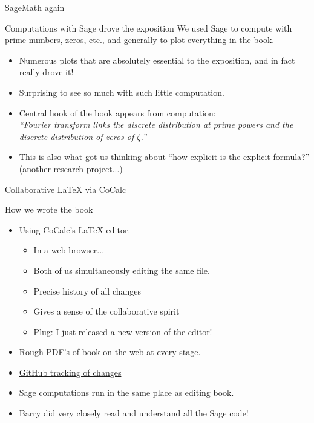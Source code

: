 \documentclass{beamer}
\begin{document}
\begin{frame}{SageMath again}
\begin{block}{Computations with Sage drove the exposition}
  We used Sage to compute with prime numbers, zeros, etc., and generally to plot everything in the book.
  \begin{itemize}
    \item Numerous plots that are absolutely essential to the exposition, and in fact really drove it!
    \item Surprising to see so much with such little computation.
    \item Central hook of the book appears from computation:\\
    {\em ``Fourier transform links the discrete distribution at prime powers and the discrete distribution of zeros of $\zeta$.''}
    \item This is also what got us thinking about ``how explicit is the explicit formula?'' (another research project...)
  \end{itemize}
  \end{block}
\end{frame}


\begin{frame}{Collaborative \LaTeX{} via CoCalc}
  \begin{block}{How we wrote the book}
    \begin{itemize}
      \item Using CoCalc's \LaTeX{} editor.
            \begin{itemize}
              \item In a web browser...
              \item Both of us simultaneously editing the same file.
              \item Precise history of all changes
              \item Gives a sense of the collaborative spirit
              \item Plug: I just released a new version of the editor!
            \end{itemize}
      \item Rough PDF's of book on the web at every stage.
      \item \href{https://github.com/williamstein/rh}{GitHub tracking of changes}
      \item Sage computations run in the same place as editing book.
      \item Barry did very closely read and understand all the Sage code!
    \end{itemize}
  \end{block}
\end{frame}
\end{document}
